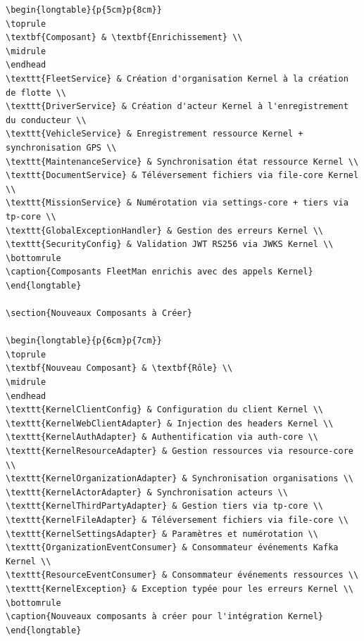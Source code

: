 \documentclass[12pt,a4paper]{report}
\begin{document}
\begin{lstlisting}[style=javaStyle, caption={Handler d'erreurs Kernel dans GlobalExceptionHandler}]
\begin{longtable}{p{5cm}p{8cm}}
\toprule
\textbf{Composant} & \textbf{Enrichissement} \\
\midrule
\endhead
\texttt{FleetService} & Création d'organisation Kernel à la création de flotte \\
\texttt{DriverService} & Création d'acteur Kernel à l'enregistrement du conducteur \\
\texttt{VehicleService} & Enregistrement ressource Kernel + synchronisation GPS \\
\texttt{MaintenanceService} & Synchronisation état ressource Kernel \\
\texttt{DocumentService} & Téléversement fichiers via file-core Kernel \\
\texttt{MissionService} & Numérotation via settings-core + tiers via tp-core \\
\texttt{GlobalExceptionHandler} & Gestion des erreurs Kernel \\
\texttt{SecurityConfig} & Validation JWT RS256 via JWKS Kernel \\
\bottomrule
\caption{Composants FleetMan enrichis avec des appels Kernel}
\end{longtable}

\section{Nouveaux Composants à Créer}

\begin{longtable}{p{6cm}p{7cm}}
\toprule
\textbf{Nouveau Composant} & \textbf{Rôle} \\
\midrule
\endhead
\texttt{KernelClientConfig} & Configuration du client Kernel \\
\texttt{KernelWebClientAdapter} & Injection des headers Kernel \\
\texttt{KernelAuthAdapter} & Authentification via auth-core \\
\texttt{KernelResourceAdapter} & Gestion ressources via resource-core \\
\texttt{KernelOrganizationAdapter} & Synchronisation organisations \\
\texttt{KernelActorAdapter} & Synchronisation acteurs \\
\texttt{KernelThirdPartyAdapter} & Gestion tiers via tp-core \\
\texttt{KernelFileAdapter} & Téléversement fichiers via file-core \\
\texttt{KernelSettingsAdapter} & Paramètres et numérotation \\
\texttt{OrganizationEventConsumer} & Consommateur événements Kafka Kernel \\
\texttt{ResourceEventConsumer} & Consommateur événements ressources \\
\texttt{KernelException} & Exception typée pour les erreurs Kernel \\
\bottomrule
\caption{Nouveaux composants à créer pour l'intégration Kernel}
\end{longtable}


\end{lstlisting}
\end{document}
